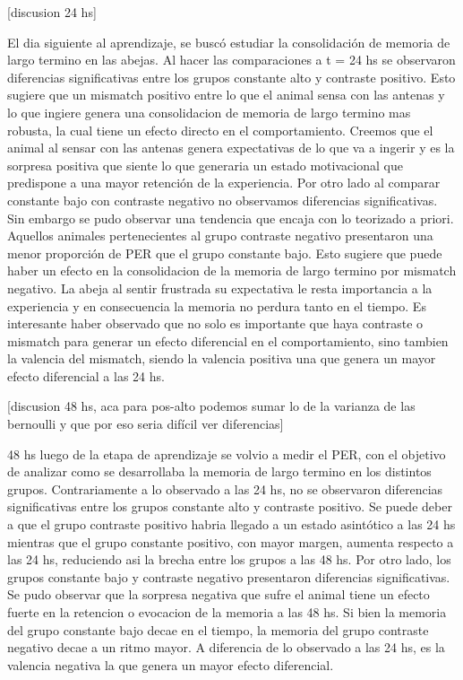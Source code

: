 \documentclass[
]{article}
\begin{document}
{[}discusion 24 hs{]}

El dia siguiente al aprendizaje, se buscó estudiar la consolidación de
memoria de largo termino en las abejas. Al hacer las comparaciones a t =
24 hs se observaron diferencias significativas entre los grupos
constante alto y contraste positivo. Esto sugiere que un mismatch
positivo entre lo que el animal sensa con las antenas y lo que ingiere
genera una consolidacion de memoria de largo termino mas robusta, la
cual tiene un efecto directo en el comportamiento. Creemos que el animal
al sensar con las antenas genera expectativas de lo que va a ingerir y
es la sorpresa positiva que siente lo que generaria un estado
motivacional que predispone a una mayor retención de la experiencia. Por
otro lado al comparar constante bajo con contraste negativo no
observamos diferencias significativas. Sin embargo se pudo observar una
tendencia que encaja con lo teorizado a priori. Aquellos animales
pertenecientes al grupo contraste negativo presentaron una menor
proporción de PER que el grupo constante bajo. Esto sugiere que puede
haber un efecto en la consolidacion de la memoria de largo termino por
mismatch negativo. La abeja al sentir frustrada su expectativa le resta
importancia a la experiencia y en consecuencia la memoria no perdura
tanto en el tiempo. Es interesante haber observado que no solo es
importante que haya contraste o mismatch para generar un efecto
diferencial en el comportamiento, sino tambien la valencia del mismatch,
siendo la valencia positiva una que genera un mayor efecto diferencial a
las 24 hs.

{[}discusion 48 hs, aca para pos-alto podemos sumar lo de la varianza de
las bernoulli y que por eso seria difícil ver diferencias{]}

48 hs luego de la etapa de aprendizaje se volvio a medir el PER, con el
objetivo de analizar como se desarrollaba la memoria de largo termino en
los distintos grupos. Contrariamente a lo observado a las 24 hs, no se
observaron diferencias significativas entre los grupos constante alto y
contraste positivo. Se puede deber a que el grupo contraste positivo
habria llegado a un estado asintótico a las 24 hs mientras que el grupo
constante positivo, con mayor margen, aumenta respecto a las 24 hs,
reduciendo asi la brecha entre los grupos a las 48 hs. Por otro lado,
los grupos constante bajo y contraste negativo presentaron diferencias
significativas. Se pudo observar que la sorpresa negativa que sufre el
animal tiene un efecto fuerte en la retencion o evocacion de la memoria
a las 48 hs. Si bien la memoria del grupo constante bajo decae en el
tiempo, la memoria del grupo contraste negativo decae a un ritmo mayor.
A diferencia de lo observado a las 24 hs, es la valencia negativa la que
genera un mayor efecto diferencial.
\end{document}
